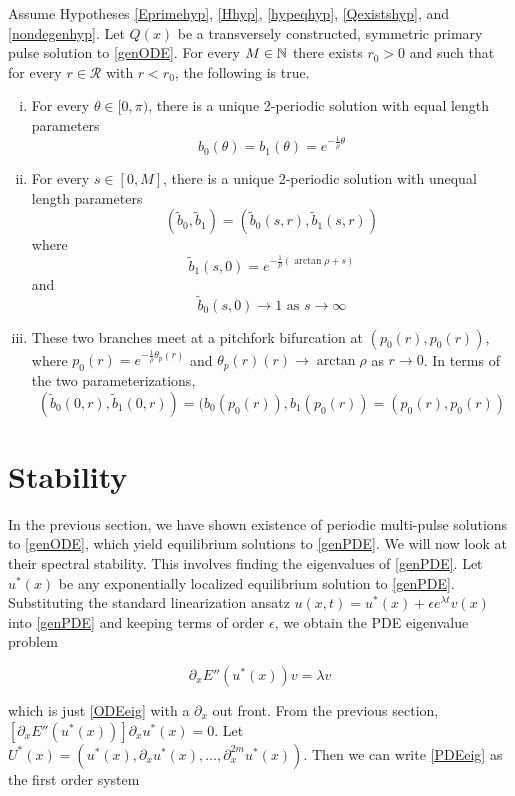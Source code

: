 \documentclass[thesis.tex]{subfiles}
\begin{document}
\begin{theorem}\label{2pulsebifurcation}
Assume Hypotheses \ref{Eprimehyp}, \ref{Hhyp}, \ref{hypeqhyp}, \ref{Qexistshyp}, and \ref{nondegenhyp}. Let $Q(x)$ be a transversely constructed, symmetric primary pulse solution to \eqref{genODE}. For every $M \in {\mathbb N}$ there exists $r_0 > 0$ and  such that for every $r \in \mathcal{R}$ with $r < r_0$, the following is true.
\begin{enumerate}[(i)]
	\item For every $\theta \in [0, \pi)$, there is a unique 2-periodic solution with equal length parameters 
	\[
	b_0(\theta) = b_1(\theta) = e^{-\frac{1}{\rho}\theta}
	\]
	\item For every $s \in [0, M]$, there is a unique 2-periodic solution with unequal length parameters
	\[
	(\tilde{b}_0, \tilde{b}_1) = (\tilde{b}_0(s, r), \tilde{b}_1(s, r))
	\]
	where
	\[
	\tilde{b}_1(s, 0) = e^{-\frac{1}{\rho}(\arctan \rho + s)}
	\]
	and
	\[
	\tilde{b}_0(s, 0) \rightarrow 1 \text{ as } s \rightarrow \infty
	\]
	\item These two branches meet at a pitchfork bifurcation at $(p_0(r), p_0(r))$, where $p_0(r) = e^{-\frac{1}{\rho}\theta_p(r)}$ and $\theta_p(r)(r) \rightarrow \arctan \rho$ as $r \rightarrow 0$. In terms of the two parameterizations,
	\[
	(\tilde{b}_0(0, r), \tilde{b}_1(0, r)) = (b_0(p_0(r)), b_1(p_0(r)) 
	= (p_0(r), p_0(r))
	\]
\end{enumerate}
\end{theorem}

\section{Stability}

In the previous section, we have shown existence of periodic multi-pulse solutions to \eqref{genODE}, which yield equilibrium solutions to \eqref{genPDE}. We will now look at their spectral stability. This involves finding the eigenvalues of \eqref{genPDE}. Let $u^*(x)$ be any exponentially localized equilibrium solution to \eqref{genPDE}. Substituting the standard linearization ansatz $u(x, t) = u^*(x) + \epsilon e^{\lambda t}v(x)$ into \eqref{genPDE} and keeping terms of order $\epsilon$, we obtain the PDE eigenvalue problem

\begin{equation}\label{PDEeig}
\partial_x E''(u^*(x)) v = \lambda v
\end{equation}

which is just \eqref{ODEeig} with a $\partial_x$ out front. From the previous section, $[\partial_x E''(u^*(x))] \partial_x u^*(x) = 0$. Let $U^*(x) = (u^*(x), \partial_x u^*(x), \dots, \partial_x^{2m}u^*(x))$. Then we can write \eqref{PDEeig} as the first order system 
\end{document}
